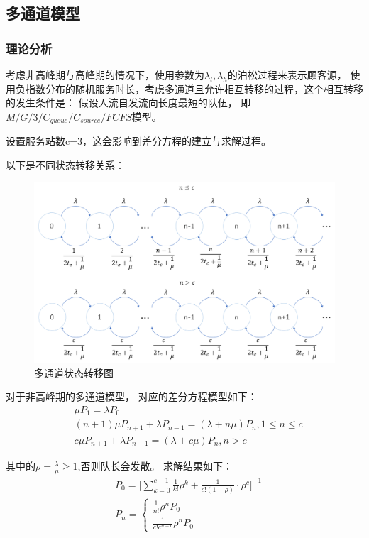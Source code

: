 \subsection{多通道模型}
\subsubsection{理论分析}
考虑非高峰期与高峰期的情况下，使用参数为$\lambda_{l},\lambda_{h}$的泊松过程来表示顾客源，
使用负指数分布的随机服务时长，考虑多通道且允许相互转移的过程，这个相互转移的发生条件是：
假设人流自发流向长度最短的队伍，
即$M/G/3/C_{queue}/C_{source}/FCFS$模型。

设置服务站数c=3，这会影响到差分方程的建立与求解过程。

以下是不同状态转移关系：
\begin{figure}[ht]    
    \centering
    \includegraphics[width=.6\textwidth]{images/transform3.PNG}
    \caption{多通道状态转移图}
    \label{fig:transform3}
\end{figure}

对于非高峰期的多通道模型，
对应的差分方程模型如下：
\begin{equation}
    \begin{aligned}
        &\mu P_1=\lambda P_0 \\
        &(n+1)\mu P_{n+1}+\lambda P_{n-1}=(\lambda+n\mu)P_n, 1\leq n\leq c \\
        &c\mu P_{n+1}+\lambda P_{n-1}=(\lambda +c\mu )P_n, n>c
    \end{aligned}
\end{equation}

其中的$\rho=\frac{\lambda}{\mu}\geq 1$,否则队长会发散。
求解结果如下：
\begin{equation}
    \begin{aligned}
        &P_0=\Big[\sum_{k=0}^{c-1}\frac{1}{k!} \rho^k +\frac{1}{c!(1-\rho)}\cdot \rho^c \Big]^{-1} \\
        &P_n=
        \begin{cases}
            \frac{1}{n!}\rho^n P_0 \\
            \frac{1}{c!c^{n-c}}\rho^n P_0
        \end{cases}
    \end{aligned}
\end{equation}

